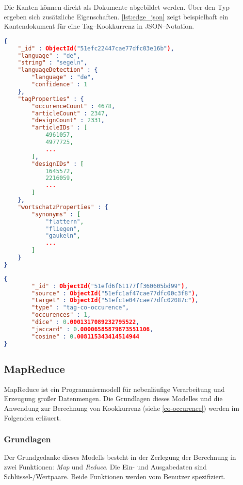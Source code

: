 Die Kanten können direkt als Dokumente abgebildet werden. Über den Typ ergeben sich zusätzliche Eigenschaften. \cref{lst:edge_json} zeigt beispielhaft ein Kantendokument für eine Tag--Kookkurrenz in JSON--Notation.

\begin{lstlisting}[language=json, label={lst:node_json}, caption={Knotendokument in JSON}]
{
    "_id" : ObjectId("51efc22447cae77dfc03e16b"),
    "language" : "de",
    "string" : "segeln",
    "languageDetection" : {
        "language" : "de",
        "confidence" : 1
    },
    "tagProperties" : {
        "occurenceCount" : 4678,
        "articleCount" : 2347,
        "designCount" : 2331,
        "articleIDs" : [ 
            4961057, 
            4977725, 
            ...
        ],
        "designIDs" : [ 
            1645572, 
            2216059, 
            ...
        ]
    },
    "wortschatzProperties" : {
        "synonyms" : [ 
            "flattern", 
            "fliegen", 
            "gaukeln", 
            ...
        ]
    }
}
\end{lstlisting}

\begin{lstlisting}[language=json, label={lst:edge_json}, caption={Kantendokument in JSON}]
{
        "_id" : ObjectId("51efd6f61177ff360605bd99"),
        "source" : ObjectId("51efc1af47cae77dfc00c3f8"),
        "target" : ObjectId("51efc1e047cae77dfc02087c"),
        "type" : "tag-co-occurence",
        "occurences" : 1,
        "dice" : 0.0001317089232795522,
        "jaccard" : 0.00006585879873551106,
        "cosine" : 0.008115343414514944
}
\end{lstlisting}

\subsection{MapReduce}
\label{mapreduce}

MapReduce \cite{dg2004} ist ein Programmiermodell für nebenläufige Verarbeitung und Erzeugung großer Datenmengen. Die Grundlagen dieses Modelles und die Anwendung zur Berechnung von Kookkurrenz (siehe \cref{co-occurence}) werden im Folgenden erläuert.

\subsubsection{Grundlagen}
\label{mapreduce_basic}

 Der Grundgedanke dieses Modells besteht in der Zerlegung der Berechnung in zwei Funktionen: \emph{Map} und \emph{Reduce}. Die Ein- und Ausgabedaten sind Schlüssel-/Wertpaare. Beide Funktionen werden vom Benutzer spezifiziert.

